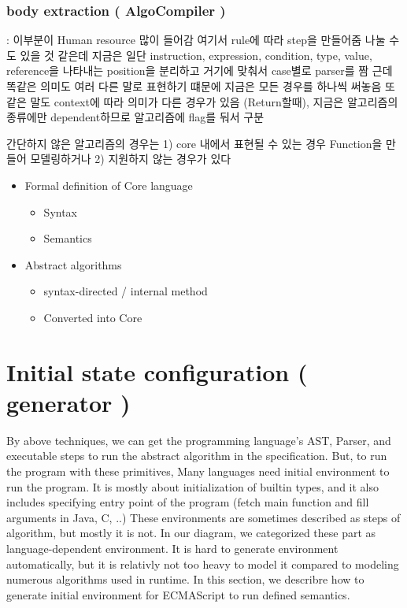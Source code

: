 \subsubsection{body extraction ( AlgoCompiler )} : 이부분이 Human resource 많이 들어감
여기서 rule에 따라 step을 만들어줌
나눌 수도 있을 것 같은데 지금은 일단 instruction, expression, condition, type, value, reference을 나타내는 position을 분리하고 거기에 맞춰서 case별로 parser를 짬
근데 똑같은 의미도 여러 다른 말로 표현하기 떄문에 지금은 모든 경우를 하나씩 써놓음
또 같은 말도 context에 따라 의미가 다른 경우가 있음 (Return할때), 지금은 알고리즘의 종류에만 dependent하므로 알고리즘에 flag를 둬서 구분

간단하지 않은 알고리즘의 경우는 1) core 내에서 표현될 수 있는 경우 Function을 만들어 모델링하거나 
2) 지원하지 않는 경우가 있다


\begin{itemize}
  \item Formal definition of Core language
    \begin{itemize}
      \item Syntax
      \item Semantics
    \end{itemize}
  \item Abstract algorithms
    \begin{itemize}
      \item syntax-directed / internal method
      \item Converted into Core
    \end{itemize}
\end{itemize}

\section{ Initial state configuration ( generator ) }

By above techniques, we can get the programming language's AST, Parser, and executable steps to run the abstract algorithm in the specification.
But, to run the program with these primitives, Many languages need initial environment to run the program. It is mostly about initialization of builtin types, and it also includes specifying entry point of the program (fetch main function and fill arguments in Java, C, ..)
These environments are sometimes described as steps of algorithm, but mostly it is not. 
In our diagram, we categorized these part as language-dependent environment. It is hard to generate environment automatically, but it is relativly not too heavy to model it compared to modeling numerous algorithms used in runtime.
In this section, we describre how to generate initial environment for ECMAScript to run defined semantics. 


